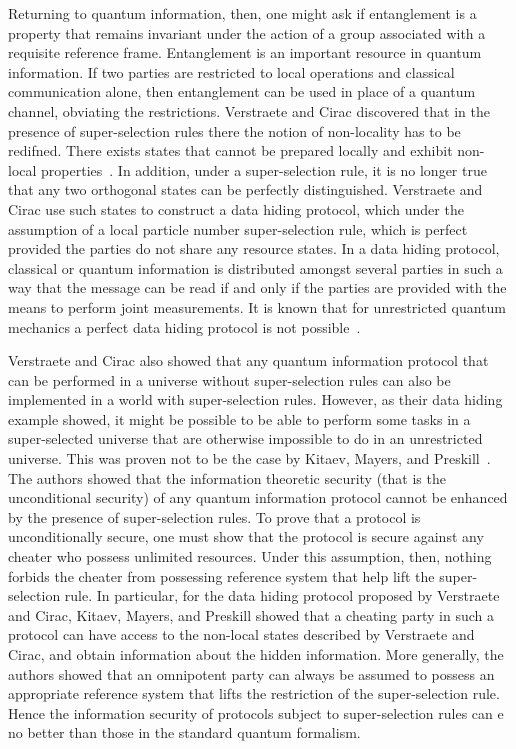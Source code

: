 \documentclass{article}
\begin{document}
Returning to quantum information, then, one might ask if entanglement is a property that remains invariant under the action of a group associated with a requisite reference frame. Entanglement is an important resource in quantum information.  If two parties are restricted to local operations and classical communication alone, then entanglement can be used in place of a quantum channel, obviating the restrictions.  Verstraete and Cirac discovered that in the presence of super-selection rules there the notion of non-locality has to be redifned.  There exists states that cannot be prepared locally and exhibit non-local properties~\cite{VC03}.  In addition, under a super-selection rule, it is no longer true that any two orthogonal states can be perfectly distinguished.  Verstraete and Cirac use such states to construct a data hiding protocol, which under the assumption of a local particle number super-selection rule, which is perfect provided the parties do not share any resource states.  In a data hiding protocol, classical or quantum information is distributed amongst several parties in such a way that the message can be read if and only if the parties are provided with the means to perform joint measurements.  It is known that for unrestricted quantum mechanics a perfect data hiding protocol is not possible~\cite{TDL01,DLT02}.

Verstraete and Cirac also showed that any quantum information protocol that can be performed in a universe without super-selection rules can also be implemented in a world with super-selection rules.  However, as their data hiding example showed, it might be possible to be able to perform some tasks in a super-selected universe that are otherwise impossible to do in an unrestricted universe.  This was proven not to be the case by Kitaev, Mayers, and Preskill~\cite{KMP04}.  The authors showed that the information theoretic security (that is the unconditional security) of any quantum information protocol cannot be enhanced by the presence of super-selection rules.  To prove that a protocol is unconditionally secure, one must show that the protocol is secure against any cheater who possess unlimited resources.  Under this assumption, then, nothing forbids the cheater from possessing reference system that help lift the super-selection rule.  In particular, for the data hiding protocol proposed by Verstraete and Cirac, Kitaev, Mayers, and Preskill showed that a cheating party in such a protocol can have access to the non-local states described by Verstraete and Cirac, and obtain information about the hidden information.  More generally, the authors showed that an omnipotent party can always be assumed to possess an appropriate reference system that lifts the restriction of the super-selection rule.  Hence the information security of protocols subject to super-selection rules can e no better than those in the standard quantum formalism.
\end{document}

